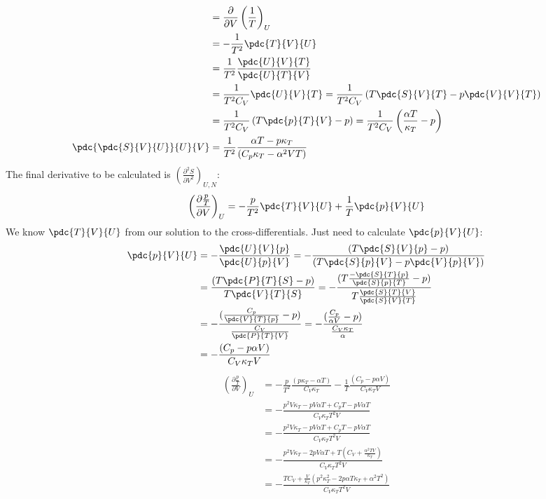 {\begin{align*}
  &= \frac{\partial}{\partial V}\left(\frac{1}{T}\right)_{U} \\
  &= -\frac{1}{T^2}\pdc{T}{V}{U} \\
  &= \frac{1}{T^2}\frac{\pdc{U}{V}{T}}{\pdc{U}{T}{V}} \\
  &= \frac{1}{T^2C_V}\pdc{U}{V}{T} = \frac{1}{T^2C_V}\left(T\pdc{S}{V}{T}-p\pdc{V}{V}{T} \right) \\
  &= \frac{1}{T^2C_V}\left(T\pdc{p}{T}{V}-p \right) = \frac{1}{T^2C_V}\left(\frac{\alpha T}{\kappa_T}-p \right) \\ 
  \pdc{\pdc{S}{V}{U}}{U}{V} &= \frac{1}{T^2}\frac{\alpha T-p\kappa_T}{(C_p\kappa_T-\alpha^2 VT)}
\end{align*}
The final derivative to be calculated is $\left(\frac{\partial^2S}{\partial V^2}\right)_{U,N}$:
\begin{align*}
	\left(\frac{\partial \frac{p}{T}}{\partial V }\right)_{U} 
   	&= -\frac{p}{T^2}\pdc{T}{V}{U}+\frac{1}{T}\pdc{p}{V}{U}\\
\end{align*}
We know $\pdc{T}{V}{U}$ from our solution to the cross-differentials. Just need to calculate $\pdc{p}{V}{U}$:
\begin{align*}
	\pdc{p}{V}{U}
    &= -\frac{\pdc{U}{V}{p}}{\pdc{U}{p}{V}}=-\frac{(T\pdc{S}{V}{p}-p)}{(T\pdc{S}{p}{V}-p\pdc{V}{p}{V})} \\
    &= \frac{(T\pdc{P}{T}{S}-p)}{T\pdc{V}{T}{S}} = -\frac{(T\frac{-\pdc{S}{T}{p}}{\pdc{S}{p}{T}}-p)}{T\frac{\pdc{S}{T}{V}}{\pdc{S}{V}{T}}} \\
    &= -\frac{(\frac{C_p}{\pdc{V}{T}{p}}-p)}{\frac{C_V}{\pdc{P}{T}{V}}} = -\frac{(\frac{C_p}{\alpha V}-p)}{\frac{C_V\kappa_T}{\alpha}} \\
    &= -\frac{(C_p-p\alpha V)}{C_V \kappa_T V}
\end{align*}
\begin{align*}
	\left(\frac{\partial \frac{p}{T}}{\partial V }\right)_{U}
    &= -\frac{p}{T^2}\frac{\left(p\kappa_T-\alpha T\right)}{C_V \kappa_T}-\frac{1}{T}\frac{(C_p-p\alpha V)}{C_V \kappa_T V} \\
    &= -\frac{p^2V\kappa_T - pV\alpha T +C_pT-pV\alpha T}{C_V\kappa_T T^2 V} \\
    &= -\frac{p^2V\kappa_T - pV\alpha T +C_pT-pV\alpha T}{C_V\kappa_T T^2 V} \\
    &= -\frac{p^2V\kappa_T - 2pV\alpha T +T(C_V +\frac{\alpha ^2TV}{\kappa_T})}{C_V\kappa_T T^2 V} \\
    &= -\frac{T C_V + \frac{V}{\kappa_T}(p^2\kappa_T^2 - 2p\alpha T\kappa_T +\alpha^2T^2)}{C_V\kappa_T T^2 V} \\

\end{align*}}
